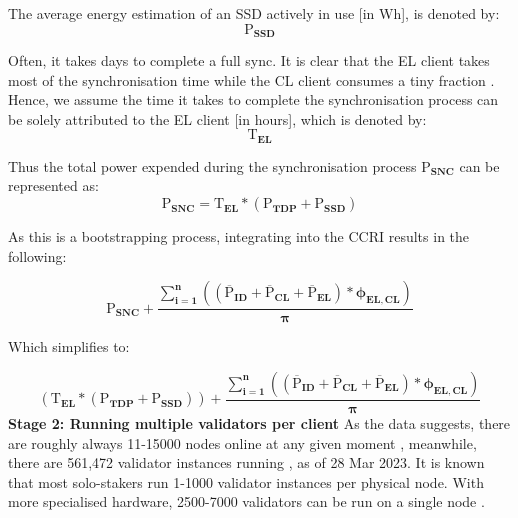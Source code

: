  The average energy estimation of an SSD actively in use [in Wh], is denoted by:
 \begin{equation*}
    \boldsymbol{\mathrm{P}_{SSD} } 
\end{equation*}

Often, it takes days to complete a full sync. It is clear that the EL client takes most of the synchronisation time while the CL client consumes a tiny fraction \cite{Ethereum/go-ethereum:Protocol}. Hence, we assume the time it takes to complete the synchronisation process can be solely attributed to the EL client [in hours], which is denoted by:
\begin{equation*}
    \boldsymbol{\mathrm{T}_{EL}}
\end{equation*}

Thus the total power expended during the synchronisation process $\boldsymbol{\mathrm{P}_{SNC}}$ can be represented as:
\begin{equation}
    \boldsymbol{\mathrm{P}_{SNC} = \mathrm{T}_{EL} * \left({\mathrm{P}_{TDP}} + \mathrm{P}_{SSD}\right)} \label{eqn:Sync}
\end{equation}

As this is a bootstrapping process, integrating  into the CCRI  results in the following:

\begin{equation*}
    \boldsymbol{\mathrm{P}_{SNC} +  {\frac{\displaystyle\sum\limits_{i=1}^{n}{ \left({\left(\mathrm{\overline{P}}_{ID} + \mathrm{\overline{P}}_{CL} + \mathrm{\overline{P}}_{EL}\right)} * {\phi_{EL,CL}} \right)}}
 {\pi}} } 
\end{equation*}

Which simplifies to:

\begin{equation}
     \boldsymbol{\left({\mathrm{T}_{EL} * \left({\mathrm{P}_{TDP}} + \mathrm{P}_{SSD}\right)}\right) +  {\frac{\displaystyle\sum\limits_{i=1}^{n}{ \left({\left(\mathrm{\overline{P}}_{ID} + \mathrm{\overline{P}}_{CL} + \mathrm{\overline{P}}_{EL}\right)} * {\phi_{EL,CL}} \right)}}
{\pi}} } \label{eqn:CCRISync}
\end{equation}
\label{AdditonalNodesReasoning}
\textbf{ Stage 2: Running multiple validators per client}
As the data suggests, there are roughly always 11-15000 nodes online at any given moment \cite{NodewatchAnalytics}, meanwhile, there are 561,472 validator instances running \cite{EthereumEthereum.orgc}, as of 28 Mar 2023. It is known that most solo-stakers run 1-1000 validator instances per physical node. With more specialised hardware, 2500-7000 validators can be run on a single node \cite{Kaushal2022ValidatingConference}. 

